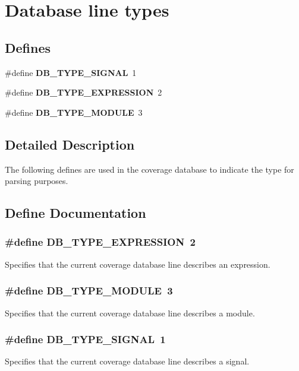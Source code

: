 \section{Database line types}
\label{group__db__types}
\subsection*{Defines}
\begin{CompactItemize}
\item 
\#define {\bf DB\_\-TYPE\_\-SIGNAL}\ 1
\item 
\#define {\bf DB\_\-TYPE\_\-EXPRESSION}\ 2
\item 
\#define {\bf DB\_\-TYPE\_\-MODULE}\ 3
\end{CompactItemize}


\subsection{Detailed Description}
The following defines are used in the coverage database to indicate the type for parsing purposes. 

\subsection{Define Documentation}
\subsubsection{\setlength{\rightskip}{0pt plus 5cm}\#define DB\_\-TYPE\_\-EXPRESSION\ 2}\label{group__db__types_a1}


Specifies that the current coverage database line describes an expression. 
\subsubsection{\setlength{\rightskip}{0pt plus 5cm}\#define DB\_\-TYPE\_\-MODULE\ 3}\label{group__db__types_a2}


Specifies that the current coverage database line describes a module. 
\subsubsection{\setlength{\rightskip}{0pt plus 5cm}\#define DB\_\-TYPE\_\-SIGNAL\ 1}\label{group__db__types_a0}


Specifies that the current coverage database line describes a signal. 